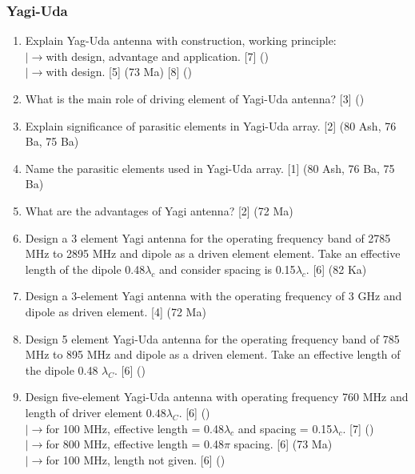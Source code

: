\documentclass[12pt]{article}
\newcommand{\lb}{\\$\left|\rightarrow\right.$}
\begin{document}
    \subsubsection{Yagi-Uda}
      \begin{enumerate}
        \item Explain Yag-Uda antenna with construction, working principle:
          \lb with design, advantage and application. \hfill [7] ()
          \lb with design. \hfill [5] (73 Ma) [8] ()
        
        \item What is the main role of driving element of Yagi-Uda antenna? \hfill [3] ()

        \item Explain significance of parasitic elements in Yagi-Uda array. \hfill [2] (80 Ash, 76 Ba, 75 Ba)

        \item Name the parasitic elements used in Yagi-Uda array. \hfill [1] (80 Ash, 76 Ba, 75 Ba)

        \item What are the advantages of Yagi antenna? \hfill [2] (72 Ma)

        \item Design a 3 element Yagi antenna for the operating frequency band of 2785 MHz to 2895 MHz and dipole as a driven element element. Take an effective length of the dipole 0.48$\lambda_c$ and consider spacing is 0.15$\lambda_c$. \hfill [6] (82 Ka)

        \item Design a 3-element Yagi antenna with the operating frequency of 3 GHz and dipole as driven element. \hfill [4] (72 Ma)

        \item Design 5 element Yagi-Uda antenna for the operating frequency band of 785 MHz to 895 MHz and dipole as a driven element. Take an effective length of the dipole 0.48 $\lambda_C$. \hfill [6] ()

        \item Design five-element Yagi-Uda antenna with operating frequency 760 MHz and length of driver element $0.48 \lambda_C$. \hfill [6] ()
          \lb for 100 MHz, effective length = 0.48$\lambda_c$ and spacing = 0.15$\lambda_c$. \hfill [7] ()
          \lb for 800 MHz, effective length = 0.48$\pi$ spacing. \hfill [6] (73 Ma)
          \lb for 100 MHz, length not given. \hfill [6] ()
      \end{enumerate}
\end{document}
